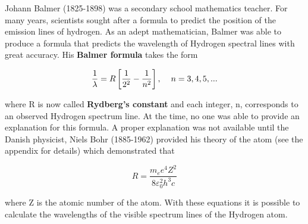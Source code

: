 Johann Balmer (1825-1898) was a secondary school mathematics teacher. For many years, scientists sought after a formula to predict the position of the emission lines of hydrogen. As an adept mathematician, Balmer was able to produce a formula that predicts the wavelength of Hydrogen spectral lines with great accuracy. His {\bf Balmer formula} takes the form

\begin{equation}
\dfrac{1}{\lambda}=R\left[\dfrac{1}{2^2}-\dfrac{1}{n^2}\right],\hspace{4mm}n=3,4,5,...
\label{equ:sp2}
\end{equation}

\noindent where R is now called {\bf Rydberg's constant} and each integer, n, corresponds to an observed Hydrogen spectrum line. At the time, no one was able to provide an explanation for this formula. A proper explanation was not available until the Danish physicist, Niels Bohr (1885-1962) provided his theory of the atom (see the appendix for details) which demonstrated that

\begin{equation}
R=\dfrac{m_ee^4Z^2}{8\varepsilon^2_0h^3c}
\label{equ:sp3}
\end{equation}

\noindent where Z is the atomic number of the atom. With these equations it is possible to calculate the wavelengths of the visible spectrum lines of the Hydrogen atom.

